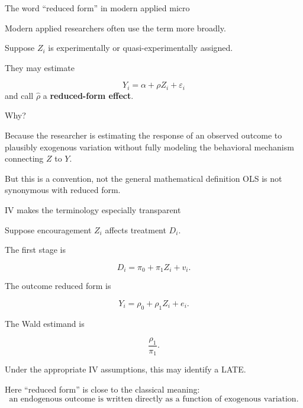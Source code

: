 \documentclass[aspectratio=169,11pt]{beamer}
\begin{document}
\begin{frame}{The word ``reduced form'' in modern applied micro}

Modern applied researchers often use the term more broadly.

Suppose $Z_i$ is experimentally or quasi-experimentally assigned.

They may estimate

\[
Y_i
=
\alpha
+
\rho Z_i
+
\varepsilon_i
\]
and call $\hat\rho$ a \textbf{reduced-form effect}.

Why?

Because the researcher is estimating the response of an observed outcome
to plausibly exogenous variation without fully modeling the behavioral
mechanism connecting $Z$ to $Y$.

\vspace{0.35em}

\begin{alertblock}{But this is a convention, not the general mathematical definition}
OLS is not synonymous with reduced form.
\end{alertblock}

\end{frame}

\begin{frame}{IV makes the terminology especially transparent}

Suppose encouragement $Z_i$ affects treatment $D_i$.

The first stage is

\[
D_i
=
\pi_0+\pi_1Z_i+v_i.
\]

The outcome reduced form is

\[
Y_i
=
\rho_0+\rho_1Z_i+e_i.
\]

The Wald estimand is

\[
\frac{\rho_1}{\pi_1}.
\]

Under the appropriate IV assumptions, this may identify a LATE.

\vspace{0.35em}

Here ``reduced form'' is close to the classical meaning:
\[
\boxed{
\text{an endogenous outcome is written directly as a function
of exogenous variation}.
}
\]

\end{frame}
\end{document}
